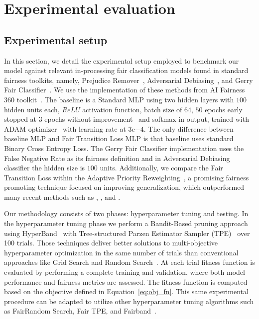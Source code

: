 \chapter{Experimental evaluation}


\section{Experimental setup} \label{sec:experimental}

In this section, we detail the experimental setup employed to benchmark our model against relevant in-processing fair classification models found in standard fairness toolkits, namely, Prejudice Remover~\citep{Kamishima2012}, Adversarial Debiasing~\citep{Zhang2018}, and Gerry Fair Classifier~\citep{pmlr-v80-kearns18a}. We use the implementation of these methods from AI Fairness 360 toolkit~\citep{aif360-oct-2018}. The baseline is a Standard MLP using two hidden layers with $100$ hidden units each, $ReLU$ activation function, batch size of $64$, $50$ epochs early stopped at $3$ epochs without improvement~\citep{Li2020} and softmax in output, trained with ADAM optimizer~\citep{KingmaB14} with learning rate at $3\mathrm{e}{-4}$. The only difference between baseline MLP and Fair Transition Loss MLP is that baseline uses standard Binary Cross Entropy Loss. The Gerry Fair Classifier implementation uses the False Negative Rate as its fairness definition and in Adversarial Debiasing classifier the hidden size is $100$ units. Additionally, we compare the Fair Transition Loss within the Adaptive Priority Reweighting~\cite{HuXT23}, a promising fairness promoting technique focused on improving generalization, which outperformed many recent methods such as \cite{jiang2020identifying}, \cite{mroueh2021fair}, and \cite{roh2020fairbatch}.

Our methodology consists of two phases: hyperparameter tuning and testing. In the hyperparameter tuning phase we perform a Bandit-Based pruning approach using HyperBand~\citep{Li2018} with Tree-structured Parzen Estimator Sampler (TPE)~\citep{bergstra2011} over 100 trials. Those techniques deliver better solutions to multi-objective hyperparameter optimization in the same number of trials than conventional approaches like Grid Search and Random Search~\citep{Morales-Hernandez2023}. At each trial fitness function is evaluated by performing a complete training and validation, where both model performance and fairness metrics are assessed. The fitness function is computed based on the objective defined in Equation~\ref{eq:obj_fn}. This same experimental procedure can be adapted to utilize other hyperparameter tuning algorithms such as FairRandom Search, Fair TPE, and Fairband~\citep{Cruz2021}.

